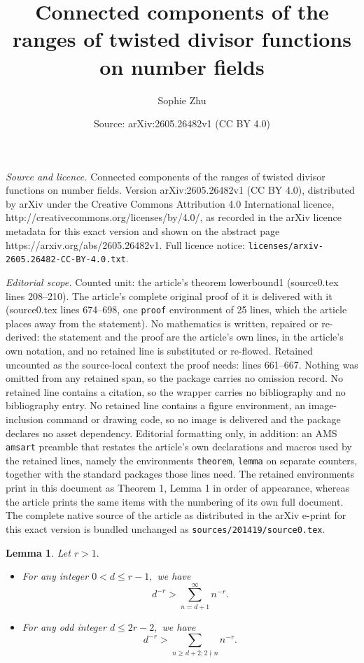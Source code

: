 \documentclass[10pt,a4paper]{amsart}
\title{Connected components of the ranges of twisted divisor functions on number fields}
\author{Sophie Zhu}
\date{Source: arXiv:2605.26482v1 (CC BY 4.0)}
\newtheorem{lemma}{Lemma}
\begin{document}
\maketitle

\noindent\emph{Source and licence.} Connected components of the ranges of twisted divisor functions on number fields. Version arXiv:2605.26482v1 (CC BY 4.0), distributed by arXiv under the Creative Commons Attribution 4.0 International licence, http://creativecommons.org/licenses/by/4.0/, as recorded in the arXiv licence metadata for this exact version and shown on the abstract page https://arxiv.org/abs/2605.26482v1. Full licence notice: \texttt{licenses/arxiv-2605.26482-CC-BY-4.0.txt}.\par\smallskip

\noindent\textit{Editorial scope.} Counted unit: the article's theorem lowerbound1 (source0.tex lines 208--210). The article's complete original proof of it is delivered with it (source0.tex lines 674--698, one \texttt{proof} environment of 25 lines, which the article places away from the statement). No mathematics is written, repaired or re-derived: the statement and the proof are the article's own lines, in the article's own notation, and no retained line is substituted or re-flowed.  Retained uncounted as the source-local context the proof needs: lines 661--667.  Nothing was omitted from any retained span, so the package carries no omission record.  No retained line contains a citation, so the wrapper carries no bibliography and no bibliography entry.  No retained line contains a figure environment, an image-inclusion command or drawing code, so no image is delivered and the package declares no asset dependency.  Editorial formatting only, in addition: an AMS \texttt{amsart} preamble that restates the article's own declarations and macros used by the retained lines, namely the environments \texttt{theorem}, \texttt{lemma} on separate counters, together with the standard packages those lines need.  The retained environments print in this document as Theorem 1, Lemma 1 in order of appearance, whereas the article prints the same items with the numbering of its own full document.  The complete native source of the article as distributed in the arXiv e-print for this exact version is bundled unchanged as \texttt{sources/201419/source0.tex}.
\begin{lemma} \label{tail}
    Let $r > 1.$
    \begin{itemize}
        \item[(1)] For any integer $0 < d \leq r-1,$ we have $$d^{-r} > \sum_{n = d+1}^\infty n^{-r}.$$
        \item[(2)] For any odd integer $d \leq 2r-2,$ we have $$d^{-r} > \sum_{n \geq d+2; 2 \nmid n} n^{-r}.$$ 
    \end{itemize}
\end{lemma}
\end{document}

